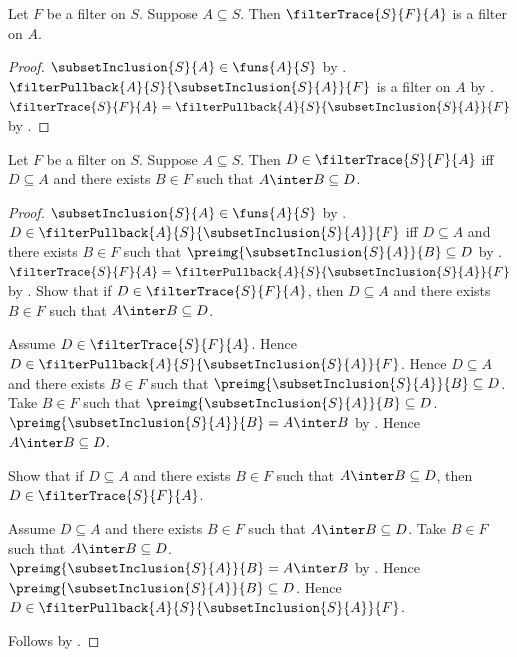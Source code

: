 \begin{proposition}\label{filter_trace_is_filter}
    Let $F$ be a filter on $S$.
    Suppose $A\subseteq S$.
    Then $\filterTrace{S}{F}{A}$ is a filter on $A$.
\end{proposition}
\begin{proof}
    $\subsetInclusion{S}{A}\in\funs{A}{S}$ by
        .
    $\filterPullback{A}{S}{\subsetInclusion{S}{A}}{F}$ is a filter on $A$
        by .
    $\filterTrace{S}{F}{A}
        =\filterPullback{A}{S}{\subsetInclusion{S}{A}}{F}$ by
        .
\end{proof}

\begin{theorem}\label{filter_trace_iff}
    Let $F$ be a filter on $S$.
    Suppose $A\subseteq S$.
    Then $D\in\filterTrace{S}{F}{A}$ iff
        $D\subseteq A$ and there exists $B\in F$ such that
        $A\inter B\subseteq D$.
\end{theorem}
\begin{proof}
    $\subsetInclusion{S}{A}\in\funs{A}{S}$ by
        .
    $D\in\filterPullback{A}{S}{\subsetInclusion{S}{A}}{F}$ iff
        $D\subseteq A$ and there exists $B\in F$ such that
        $\preimg{\subsetInclusion{S}{A}}{B}\subseteq D$ by
        .
    $\filterTrace{S}{F}{A}
        =\filterPullback{A}{S}{\subsetInclusion{S}{A}}{F}$ by
        .
    Show that if $D\in\filterTrace{S}{F}{A}$, then
        $D\subseteq A$ and there exists $B\in F$ such that
        $A\inter B\subseteq D$.
    \begin{subproof}
        Assume $D\in\filterTrace{S}{F}{A}$.
        Hence $D\in\filterPullback{A}{S}{\subsetInclusion{S}{A}}{F}$.
        Hence $D\subseteq A$ and there exists $B\in F$ such that
            $\preimg{\subsetInclusion{S}{A}}{B}\subseteq D$.
        Take $B\in F$ such that
            $\preimg{\subsetInclusion{S}{A}}{B}\subseteq D$.
        $\preimg{\subsetInclusion{S}{A}}{B}=A\inter B$ by
            .
        Hence $A\inter B\subseteq D$.
    \end{subproof}
    Show that if $D\subseteq A$ and there exists $B\in F$ such that
        $A\inter B\subseteq D$, then $D\in\filterTrace{S}{F}{A}$.
    \begin{subproof}
        Assume $D\subseteq A$ and there exists $B\in F$ such that
            $A\inter B\subseteq D$.
        Take $B\in F$ such that $A\inter B\subseteq D$.
        $\preimg{\subsetInclusion{S}{A}}{B}=A\inter B$ by
            .
        Hence $\preimg{\subsetInclusion{S}{A}}{B}\subseteq D$.
        Hence $D\in\filterPullback{A}{S}{\subsetInclusion{S}{A}}{F}$.
    \end{subproof}
    Follows by \auto.
\end{proof}

